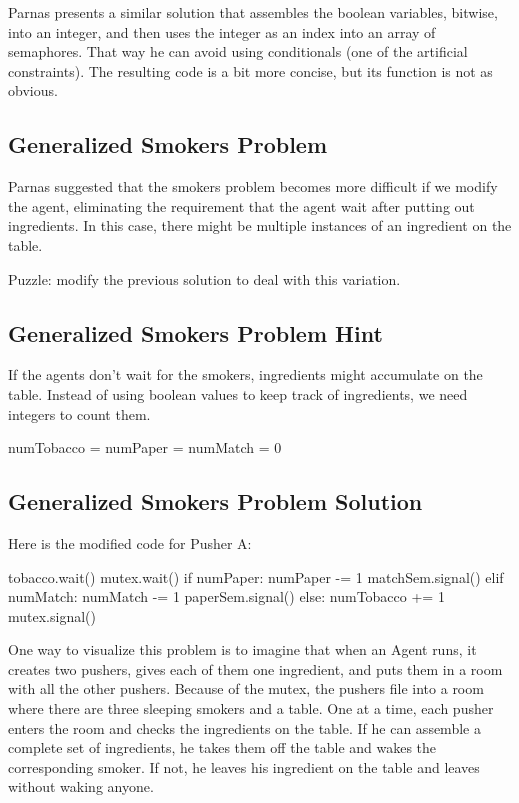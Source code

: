 \documentclass{book}
\begin{document}
Parnas presents a similar solution that assembles the
boolean variables, bitwise, into an integer, and then
uses the integer as an index into an array of semaphores.
That way he can avoid using conditionals (one of the
artificial constraints).  The resulting code is a bit
more concise, but its function is not as obvious.


\subsection{Generalized Smokers Problem}

Parnas suggested that the smokers problem becomes more
difficult if we modify the agent, eliminating the requirement
that the agent wait after putting out ingredients.  In this
case, there might be multiple instances of an ingredient on
the table.

Puzzle: modify the previous solution to deal with this
variation.



\subsection{Generalized Smokers Problem Hint}

If the agents don't wait for the smokers, ingredients might
accumulate on the table.  Instead of using boolean values to
keep track of ingredients, we need integers to count them.

\begin{unbreakable}[title={Generalized Smokers problem hint}]{}
numTobacco = numPaper = numMatch = 0
\end{unbreakable}



\subsection{Generalized Smokers Problem Solution}
\label{smoker}

Here is the modified code for Pusher A:

\begin{unbreakable}[title={Pusher A}]{}
tobacco.wait()
mutex.wait()
    if numPaper:
        numPaper -= 1
        matchSem.signal()
    elif numMatch:
        numMatch -= 1
        paperSem.signal()
    else: 
        numTobacco += 1
mutex.signal()
\end{unbreakable}

One way to visualize this problem is to imagine that when an
Agent runs, it creates two pushers, gives each of them one ingredient,
and puts them in a room with all the other pushers.  Because of the
mutex, the pushers file into a room where there are
three sleeping smokers and a table.  One at a time, each pusher enters
the room and checks the ingredients on the table.  If he can
assemble a complete set of ingredients, he takes them off the table
and wakes the corresponding smoker.  If not, he leaves his ingredient
on the table and leaves without waking anyone.
\end{document}

